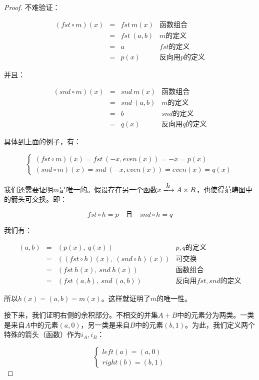 \documentclass[UTF8]{article}
\begin{document}
\begin{proof}
不难验证：

\[
\begin{array}{rcll}
(fst \circ m)(x) & = & fst\ m(x) & \text{函数组合} \\
                 & = & fst\ (a, b) & \text{$m$的定义} \\
                 & = & a & \text{$fst$的定义} \\
                 & = & p(x) & \text{反向用$p$的定义}
\end{array}
\]

并且：

\[
\begin{array}{rcll}
(snd \circ m)(x) & = & snd\ m(x) & \text{函数组合} \\
                 & = & snd\ (a, b) & \text{$m$的定义} \\
                 & = & b & \text{$snd$的定义} \\
                 & = & q(x) & \text{反向用$q$的定义}
\end{array}
\]

具体到上面的例子，有：

\[
\begin{cases}
(fst \circ m)(x) = fst\ (-x, even(x)) = -x = p(x) \\
(snd \circ m)(x) = snd\ (-x, even(x)) = even(x) = q(x)
\end{cases}
\]

我们还需要证明$m$是唯一的。假设存在另一个函数$x \arrowto{h} A \times B$，也使得范畴图中的箭头可交换。即：

\[
fst \circ h = p \quad \text{且} \quad snd \circ h = q
\]

我们有：

\[
\begin{array}{rcll}
(a, b) & = & (p(x),\ q(x)) & \text{$p, q$的定义} \\
       & = & ((fst \circ h)(x),\ (snd \circ h)(x)) & \text{可交换} \\
       & = & (fst\ h(x),\ snd\ h(x)) & \text{函数组合} \\
       & = & (fst\ (a, b),\ snd\ (a, b)) & \text{反向用$fst, snd$的定义}
\end{array}
\]

所以$h(x) = (a, b) = m(x)$。这样就证明了$m$的唯一性。

接下来，我们证明右侧的余积部分。不相交的并集$A+B$中的元素分为两类。一类是来自$A$中的元素$(a, 0)$，另一类是来自$B$中的元素$(b, 1)$。为此，我们定义两个特殊的箭头（函数）作为$i_A, i_B$：

\[
\begin{cases}
left(a) = (a, 0) \\
right(b) = (b, 1)
\end{cases}
\]


\end{proof}
\end{document}
